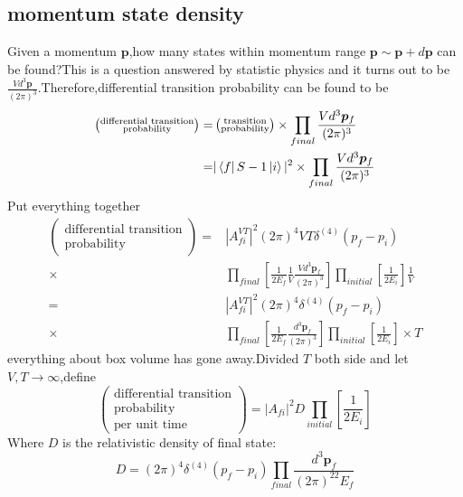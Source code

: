 \documentclass[a4paper]{article}
\begin{document}
\subsection{momentum state density}
Given a momentum $\bm{p}$,how many states within momentum range $\bm{p}\sim\bm{p}+d\bm{p}$ can be found?This is a question answered by statistic physics and it turns out to be $\frac{Vd^3\bm{p}}{(2\pi)^3}$.Therefore,differential transition probability can be found to be
\begin{align*}
\left(\substack{\text{differential transition}\\ \text{probability}}\right)=&\left(\substack{\text{transition}\\ \text{probability}}\right) \times\prod_{final}\frac{Vd^3\bm{p}_f}{(2\pi)^3} \\=&|\bra{f}S-1\ket{i}|^2\times\prod_{final}\frac{Vd^3\bm{p}_f}{(2\pi)^3}
\end{align*}
Put everything together
\begin{align*}
	\left(\substack{\text{differential transition}\\ \text{probability}}\right)=&|A_{fi}^{VT}|^2(2\pi)^4VT\delta^{(4)}(p_f-p_i)\\
	\times&\prod_{final}[\frac{1}{2E_f}\frac{1}{V}\frac{Vd^3\bm{p}_f}{(2\pi)^3}]\prod_{initial}[\frac{1}{2E_i}]\frac{1}{V}\\=&|A_{fi}^{VT}|^2(2\pi)^4\delta^{(4)}(p_f-p_i)\\
	\times&\prod_{final}[\frac{1}{2E_f}\frac{d^3\bm{p}_f}{(2\pi)^3}]\prod_{initial}[\frac{1}{2E_i}]\times T
\end{align*}
everything about box volume has gone away.Divided $T$ both side and let $V,T\rightarrow\infty$,define$$\left(\substack{\text{differential transition}\\ \text{probability}\\ \text{per unit time}}\right)=|A_{fi}|^2D\prod_{initial}[\frac{1}{2E_i}]$$
Where $D$ is the relativistic density of final state:$$D=(2\pi)^4\delta^{(4)}(p_f-p_i)\prod_{final}\frac{d^3\bm{p}_f}{(2\pi)^22E_f}$$
\end{document}
